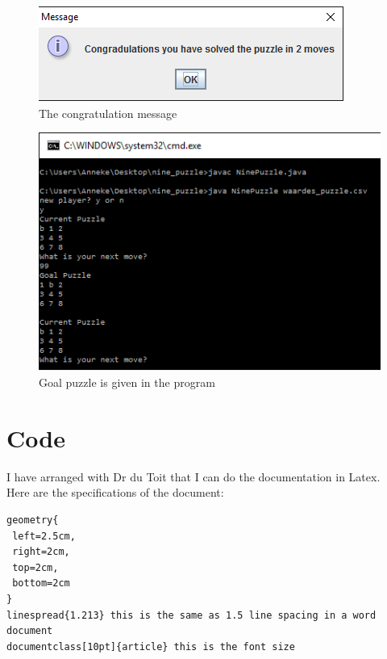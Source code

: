 \documentclass[10pt]{article}
\begin{document}
\begin{figure}
\centering
\includegraphics[scale=0.8]{./Prente/prent6.png}
\caption{The congratulation message}
\label{prent6}
\end{figure}

\begin{figure}
\centering
\includegraphics[scale=0.8]{./Prente/prent7.png}
\caption{Goal puzzle is given in the program}
\label{prent7}
\end{figure}

\section{Code}
 \begin{scriptsize}
 
 \end{scriptsize}

 

I have arranged with Dr du Toit that I can do the documentation in Latex.
\\Here are the specifications of the document:
\begin{verbatim}
geometry{
 left=2.5cm,
 right=2cm,
 top=2cm,
 bottom=2cm
}
linespread{1.213} this is the same as 1.5 line spacing in a word document
documentclass[10pt]{article} this is the font size
\end{verbatim}
\end{document}
